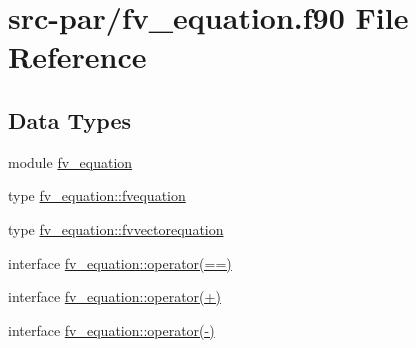 \hypertarget{fv__equation_8f90}{\section{src-\/par/fv\-\_\-equation.f90 File Reference}
\label{fv__equation_8f90}
}
\subsection*{Data Types}
\begin{DoxyCompactItemize}
\item 
module \hyperlink{classfv__equation}{fv\-\_\-equation}
\item 
type \hyperlink{structfv__equation_1_1fvequation}{fv\-\_\-equation\-::fvequation}
\item 
type \hyperlink{structfv__equation_1_1fvvectorequation}{fv\-\_\-equation\-::fvvectorequation}
\item 
interface \hyperlink{interfacefv__equation_1_1operator_07_0A_0A_08}{fv\-\_\-equation\-::operator(==)}
\item 
interface \hyperlink{interfacefv__equation_1_1operator_07_09_08}{fv\-\_\-equation\-::operator(+)}
\item 
interface \hyperlink{interfacefv__equation_1_1operator_07-_08}{fv\-\_\-equation\-::operator(-\/)}
\end{DoxyCompactItemize}
